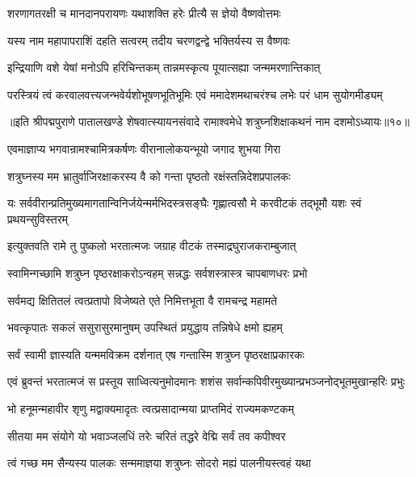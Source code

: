 \twolineshloka
{शरणागतरक्षी च मानदानपरायणः}
{यथाशक्ति हरेः प्रीत्यै स ज्ञेयो वैष्णवोत्तमः}%

\twolineshloka
{यस्य नाम महापापराशिं दहति सत्वरम्}
{तदीय चरणद्वन्द्वे भक्तिर्यस्य स वैष्णवः}%

\twolineshloka
{इन्द्रियाणि वशे येषां मनोऽपि हरिचिन्तकम्}
{तान्नमस्कृत्य पूयात्सह्या जन्ममरणान्तिकात्}%

\twolineshloka
{परस्त्रियं त्वं करवालवत्त्यजन्भवेर्यशोभूषणभूतिभूमिः}
{एवं ममादेशमथाचरंश्च लभेः परं धाम सुयोगमीड्यम्}%

{॥इति श्रीपद्मपुराणे पातालखण्डे शेषवात्स्यायनसंवादे रामाश्वमेधे शत्रुघ्नशिक्षाकथनं नाम दशमोऽध्यायः॥१०॥}

\resetShloka


\twolineshloka
{एवमाज्ञाप्य भगवान्रामश्चामित्रकर्षणः}
{वीरानालोकयन्भूयो जगाद शुभया गिरा}%

\twolineshloka
{शत्रुघ्नस्य मम भ्रातुर्वाजिरक्षाकरस्य वै}
{को गन्ता पृष्ठतो रक्षंस्तन्निदेशप्रपालकः}%

\twolineshloka
{यः सर्ववीरान्प्रतिमुख्यमागतान्विनिर्जयेन्मर्मभिदस्त्रसङ्घैः}
{गृह्णात्वसौ मे करवीटकं तद्भूमौ यशः स्वं प्रथयन्सुविस्तरम्}%

\twolineshloka
{इत्युक्तवति रामे तु पुष्कलो भरतात्मजः}
{जग्राह वीटकं तस्माद्रघुराजकराम्बुजात्}%

\twolineshloka
{स्वामिन्गच्छामि शत्रुघ्न पृष्ठरक्षाकरोऽन्वहम्}
{सन्नद्धः सर्वशस्त्रास्त्र चापबाणधरः प्रभो}%

\twolineshloka
{सर्वमद्य क्षितितलं त्वत्प्रतापो विजेष्यते}
{एते निमित्तभूता वै रामचन्द्र महामते}%

\twolineshloka
{भवत्कृपातः सकलं ससुरासुरमानुषम्}
{उपस्थितं प्रयुद्धाय तन्निषेधे क्षमो ह्यहम्}%

\twolineshloka
{सर्वं स्वामी ज्ञास्यति यन्ममविक्रम दर्शनात्}
{एष गन्तास्मि शत्रुघ्न पृष्ठरक्षाप्रकारकः}%

\twolineshloka
{एवं ब्रुवन्तं भरतात्मजं स प्रस्तूय साध्वित्यनुमोदमानः}
{शशंस सर्वान्कपिवीरमुख्यान्प्रभञ्जनोद्भूतमुखान्हरिः प्रभुः}%

\twolineshloka
{भो हनूमन्महावीर शृणु मद्वाक्यमादृतः}
{त्वत्प्रसादान्मया प्राप्तमिदं राज्यमकण्टकम्}%

\twolineshloka
{सीतया मम संयोगे यो भवाञ्जलधिं तरेः}
{चरितं तद्धरे वेद्मि सर्वं तव कपीश्वर}%

\twolineshloka
{त्वं गच्छ मम सैन्यस्य पालकः सन्ममाज्ञया}
{शत्रुघ्नः सोदरो मह्यं पालनीयस्त्वहं यथा}%

